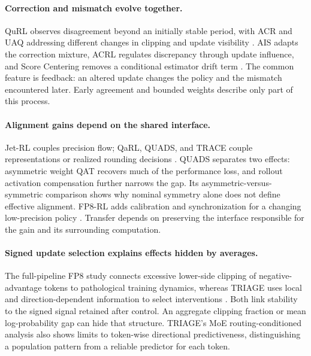 \paragraph{Correction and mismatch evolve together.}
QuRL observes disagreement beyond an initially stable period, with ACR and UAQ addressing different changes in clipping and update visibility \citep{qurl}. AIS adapts the correction mixture, ACRL regulates discrepancy through update influence, and Score Centering removes a conditional estimator drift term \citep{ais,acrl,score}. The common feature is feedback: an altered update changes the policy and the mismatch encountered later. Early agreement and bounded weights describe only part of this process.

\paragraph{Alignment gains depend on the shared interface.}
Jet-RL couples precision flow; QaRL, QUADS, and TRACE couple representations or realized rounding decisions \citep{jet,qarl,quads,trace}. QUADS separates two effects: asymmetric weight QAT recovers much of the performance loss, and rollout activation compensation further narrows the gap. Its asymmetric-versus-symmetric comparison shows why nominal symmetry alone does not define effective alignment. FP8-RL adds calibration and synchronization for a changing low-precision policy \citep{fp8rl}. Transfer depends on preserving the interface responsible for the gain and its surrounding computation.

\paragraph{Signed update selection explains effects hidden by averages.}
The full-pipeline FP8 study connects excessive lower-side clipping of negative-advantage tokens to pathological training dynamics, whereas TRIAGE uses local and direction-dependent information to select interventions \citep{fullfp8,triage}. Both link stability to the signed signal retained after control. An aggregate clipping fraction or mean log-probability gap can hide that structure. TRIAGE's MoE routing-conditioned analysis also shows limits to token-wise directional predictiveness, distinguishing a population pattern from a reliable predictor for each token.

